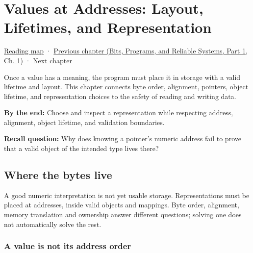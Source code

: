 \chapter{Values at Addresses: Layout, Lifetimes, and Representation}\label{01-foundations-i-ch002-values-at-addresses-layout-lifetimes-and-representation}\hypertarget{01-foundations-i-ch002}{}\label{stagechapter:01-foundations-i-ch002}

\hypertarget{01-foundations-i-ch002-values-at-addresses-layout-lifetimes-and-representation}{}

\hyperref[volume-reading-map]{Reading map} · \href{../01-Bits-Programs-and-Reliable-Systems-P01/main.pdf\#01-foundations-i-ch001-from-bits-to-running-systems}{Previous chapter (Bits, Programs, and Reliable Systems, Part 1, Ch. 1)} · \hyperref[01-foundations-i-ch003-records-as-resource-transactions]{Next chapter}

Once a value has a meaning, the program must place it in storage with a valid lifetime and layout. This chapter connects byte order, alignment, pointers, object lifetime, and representation choices to the safety of reading and writing data.

\textbf{By the end:} Choose and inspect a representation while respecting address, alignment, object lifetime, and validation boundaries.

\textbf{Recall question:} Why does knowing a pointer's numeric address fail to prove that a valid object of the intended type lives there?

\section{Where the bytes live}\label{01-foundations-i-ch002-where-the-bytes-live}

\hypertarget{01-foundations-i-ch002-where-the-bytes-live}{}

A good numeric interpretation is not yet usable storage. Representations must be placed at addresses, inside valid objects and mappings. Byte order, alignment, memory translation and ownership answer different questions; solving one does not automatically solve the rest.

\subsection{A value is not its address order}\label{01-foundations-i-ch002-a-value-is-not-its-address-order}

\hypertarget{01-foundations-i-ch002-a-value-is-not-its-address-order}{}

